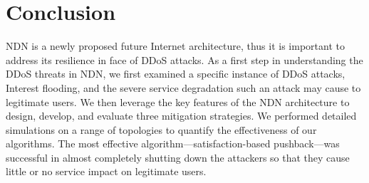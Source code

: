 \section{Conclusion}
\label{sec:conclusion}


%
%

NDN is a newly proposed future Internet architecture, thus it is important to address its resilience in face of DDoS attacks. As a first step in understanding the DDoS threats in NDN, we first examined a specific instance of DDoS attacks, Interest flooding, and the severe service degradation such an attack may cause to legitimate users. We then leverage the key features of the NDN architecture to design, develop, and evaluate three mitigation strategies.
We performed detailed simulations on a range of topologies to quantify the effectiveness of our algorithms.   
The most effective algorithm---satisfaction-based pushback---was successful in almost completely shutting down the attackers so that they cause little or no service impact on legitimate users.

